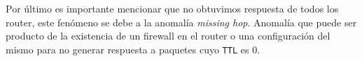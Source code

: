 Por último es importante mencionar que no obtuvimos respuesta de todos los router, este fenómeno se debe a la anomalía \textit{missing hop}. Anomalía que puede ser producto de la existencia de un firewall en el router o una configuración del mismo para no generar respuesta a paquetes cuyo \texttt{TTL} es 0.

